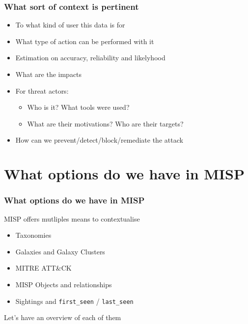 \begin{frame}
    \frametitle{What sort of context is pertinent}
    \begin{itemize}
        \item To what kind of user this data is for
        \item What type of action can be performed with it 
        \item Estimation on accuracy, reliability and likelyhood
        \item What are the impacts
        \item For threat actors:
        \begin{itemize}
            \item Who is it? What tools were used?
            \item What are their motivations? Who are their targets?
        \end{itemize}
        \item How can we prevent/detect/block/remediate the attack
    \end{itemize}
\end{frame}

\section{What options do we have in MISP}
\begin{frame}
    \frametitle{What options do we have in MISP}
    MISP offers mutliples means to contextualise
    \begin{itemize}
        \item Taxonomies
        \item Galaxies and Galaxy Clusters
        \item MITRE ATT\&CK
        \item MISP Objects and relationships
        \item Sightings and \texttt{first\_seen} / \texttt{last\_seen}
    \end{itemize}

    Let's have an overview of each of them
\end{frame}

